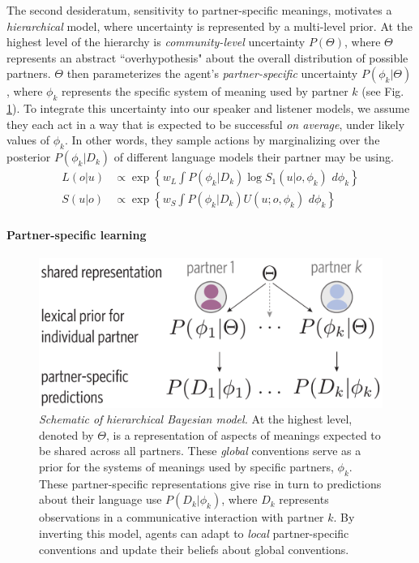 The second desideratum, sensitivity to partner-specific meanings, motivates a \emph{hierarchical} model, where uncertainty is represented by a multi-level prior. 
At the highest level of the hierarchy is \emph{community-level} uncertainty $P(\Theta)$, where $\Theta$ represents an abstract ``overhypothesis" about the overall distribution of possible partners. 
$\Theta$ then parameterizes the agent's \emph{partner-specific} uncertainty $P(\phi_{k} | \Theta)$, where $\phi_k$ represents the specific system of meaning used by partner $k$ (see Fig. \ref{fig:model_schematic}). 
To integrate this uncertainty into our speaker and listener models, we assume they each act in a way that is expected to be successful \emph{on average}, under likely values of $\phi_k$.
In other words, they sample actions by marginalizing over the posterior $P(\phi_k | D_k)$ of different language models their partner may be using.
\begin{align}
L(o|u) &\propto   \exp\left\{w_L \textstyle{\int} P(\phi_k | D_k)  \log S_1(u|o, \phi_k)\,\,d\phi_k\right\}\label{eq:marginalized}\\
S(u|o) &\propto  \exp\left\{w_S \textstyle{\int} P(\phi_k | D_k)  U(u; o, \phi_k) \,\,d\phi_k\right\}\nonumber
\end{align}

\paragraph{Partner-specific learning}

\begin{figure}[t!]
\includegraphics[scale=0.4]{./figures/task1_model.pdf}
\vspace{.5em}
\caption{\emph{Schematic of hierarchical Bayesian model.} At the highest level, denoted by $\Theta$, is a representation of aspects of meanings expected to be shared across all partners. These \emph{global} conventions serve as a prior for the systems of meanings used by specific partners, $\phi_k$. These partner-specific representations give rise in turn to predictions about their language use $P(D_k|\phi_k)$, where $D_k$ represents observations in a communicative interaction with partner $k$. By inverting this model, agents can adapt to \emph{local} partner-specific conventions and update their beliefs about global conventions.}
\label{fig:model_schematic}
\end{figure}

